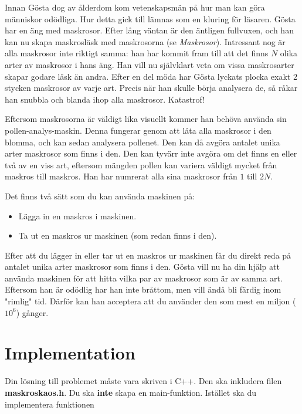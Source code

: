 \noindent
Innan Gösta dog av ålderdom kom vetenskapsmän på hur man kan göra människor odödliga. Hur detta gick till lämnas som en
kluring för läsaren. Gösta har en äng med maskrosor. Efter lång väntan är den äntligen fullvuxen, och han kan nu skapa
maskrosläsk med maskrosorna (se \textit{Maskrosor}). Intressant nog är alla maskrosor inte riktigt samma: han har kommit
fram till att det finns $N$ olika arter av maskrosor i hans äng. Han vill nu självklart veta om vissa maskrosarter skapar
godare läsk än andra. Efter en del möda har Gösta lyckats plocka exakt $2$
stycken maskrosor av varje art. Precis när han skulle börja analysera de, så råkar han snubbla och blanda ihop alla
maskrosor. Katastrof!

Eftersom maskrosorna är väldigt lika visuellt kommer han behöva använda sin pollen-analys-maskin. 
Denna fungerar genom att låta alla maskrosor i den blomma, och kan sedan analysera pollenet. Den kan då avgöra
antalet unika arter maskrosor som finns i den. Den kan tyvärr inte avgöra om det finns en eller två av en viss art,
eftersom mängden pollen kan variera väldigt mycket från maskros till maskros. Han har numrerat alla sina maskrosor
från $1$ till $2N$. 

Det finns två sätt som du kan använda maskinen på:
\begin{itemize}
  \item Lägga in en maskros i maskinen.
  \item Ta ut en maskros ur maskinen (som redan finns i den).
\end{itemize}

Efter att du lägger in eller tar ut en maskros ur maskinen får du direkt reda på antalet unika arter maskrosor
som finns i den.
Gösta vill nu ha din hjälp att använda maskinen för att hitta vilka par av maskrosor som är av samma art.
Eftersom han är odödlig har han inte bråttom, men vill ändå bli färdig inom "rimlig" tid. Därför kan han acceptera
att du använder den som mest en miljon ($10^6$) gånger.

\section*{Implementation}
Din lösning till problemet måste vara skriven i C++. Den ska inkludera filen \textbf{maskroskaos.h}. 
Du ska \textbf{inte} skapa en main-funktion. Istället ska du implementera funktionen\\

